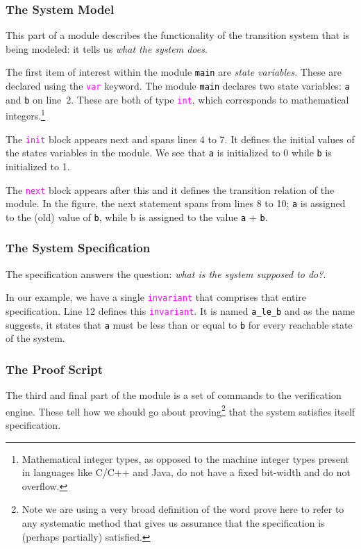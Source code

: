\documentclass{article}
\newcommand{\uclid}{{\sc{Uclid}}}
\newcommand{\keyword}[1]{\textcolor{magenta}{\texttt{#1}}}
\newcommand{\ident}[1]{\textcolor{black}{\texttt{#1}}}
\newcommand{\keywordbf}[1]{\textcolor{magenta}{\texttt{{#1}}}}
\begin{document}
\subsubsection{The System Model}
This part of a \uclid{} module describes the functionality of the transition system that is being modeled: it tells us \emph{what the system does}.

The first item of interest within the module \ident{main} are \emph{state variables}. These are declared using the \keywordbf{var} keyword. The module \ident{main} declares two state variables: \ident{a} and \ident{b} on line~2. These are both of type \keywordbf{int}, which corresponds to mathematical integers.\footnote{Mathematical integer types, as opposed to the machine integer types present in languages like C/C++ and Java, do not have a fixed bit-width and do not overflow.}

The \keywordbf{init} block appears next and spans lines 4 to 7. It defines the initial values of the states variables in the module. We see that \ident{a} is initialized to 0 while \ident{b} is initialized to 1.

The \keywordbf{next} block appears after this and it defines the transition relation of the module. In the figure, the next statement spans from lines 8 to 10; \ident{a} is assigned to the (old) value of \ident{b}, while b is assigned to the value \ident{a} + \ident{b}.

\subsubsection{The System Specification}
The specification answers the question: \emph{what is the system supposed to do?}. 

In our example, we have a single \keywordbf{invariant} that comprises that entire specification. Line 12 defines this \keyword{invariant}. It is named \ident{a\_le\_b} and as the name suggests, it states that \ident{a} must be less than or equal to \ident{b} for every reachable state of the system.

\subsubsection{The Proof Script}
The third and final part of the \uclid{} module is a set of commands to the \uclid{} verification engine. These tell how we should go about proving\footnote{Note we are using a very broad definition of the word prove here to refer to any systematic method that gives us assurance that the specification is (perhaps partially) satisfied.} that the system satisfies itself specification.
\end{document}
